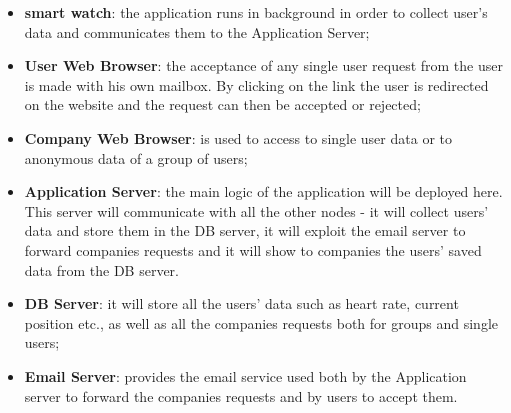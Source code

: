 \documentclass{article}
\begin{document}
\begin{itemize}
\item \textbf{smart watch}: the application runs in background in order to collect user's data and communicates them to the Application Server;
\item \textbf{User Web Browser}: the acceptance of any single user request from the user is made with his own mailbox. By clicking on the link the user is redirected on the website and the request can then be accepted or rejected;
\item \textbf{Company Web Browser}: is used to access to single user data or to anonymous data of a group of users;
\item \textbf{Application Server}: the main logic of the application will be deployed here. This server will communicate with all the other nodes - it will collect users' data and store them in the DB server, it will exploit the email server to forward companies requests and it will show to companies the users' saved data from the DB server.
\item \textbf{DB Server}: it will store all the users' data such as heart rate, current position etc., as well as all the companies requests both for groups and single users;
\item \textbf{Email Server}: provides the email service used both by the Application server to forward the companies requests and by users to accept them.
\end{itemize}
\end{document}
